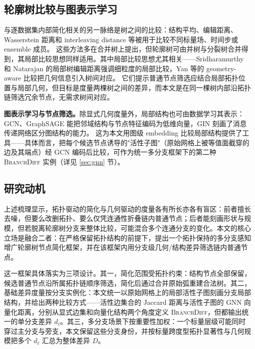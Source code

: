\documentclass[twocolumn, a4paper, 10pt]{article}
\begin{document}
\subsection{轮廓树比较与图表示学习}

与逐数据集内部简化相关的另一脉络是树之间的比较：结构平均、编辑距离、Wasserstein 距离和 interleaving distance 等被用于比较不同标量场、时间步或 ensemble 成员。\cite{yan_average_2020,pont_wasserstein_2022,wetzels_branch_2022} 这些方法多在合并树上提出，但轮廓树可由并树与分裂树合并得到，其局部比较思想同样适用。其中局部比较思想尤其相关——Sridharamurthy 和 Natarajan 的局部树编辑距离强调细粒度的局部比较，Yan 等的 geometry-aware 比较把几何信息引入树间对应。\cite{sridharamurthy_local_2023,yan_geometry_2023} 它们提示普通节点筛选应结合局部拓扑位置与局部几何，但目标是度量两棵树之间的差异，而本文是在同一棵树内部沿拓扑链筛选冗余节点，无需求树间对应。

\textbf{图表示学习与节点筛选。}除显式几何度量外，局部结构也可由数据学习其表示：GCN、GraphSAGE 能把邻域结构与节点特征编码为低维向量，GIN 刻画了消息传递网络区分图结构的能力。\cite{kipf_gcn_2017,hamilton_graphsage_2017,xu_gin_2019} 这为本文用图级 embedding 比较局部结构提供了工具——具体而言，把每个候选节点诱导的"活性子图"（原始网格上被等值面截穿的边及其端点）经 GCN 编码后比较，可作为统一多分支框架下的第二种 \textsc{BranchDiff} 实例（详见 \ref{sec:gnn} 节）。

\subsection{研究动机}

上述梳理显示，拓扑驱动的简化与几何驱动的度量各有所长亦各有盲区：前者擅长去噪，但要么改删拓扑、要么仅凭连通性折叠链内普通节点；后者能刻画形状与规模，但若脱离轮廓树分支来整体比较，可能混合多个连通分支的变化。本文的核心立场是融合二者：在严格保留拓扑结构的前提下，提出一个拓扑保持的多分支感知增广轮廓树节点简化框架，并在该框架内用分支级几何/结构差异筛选链内普通节点。

这一框架具体落实为三项设计。其一，简化范围受拓扑约束：结构节点全部保留，候选普通节点沿所属拓扑链顺序筛选，简化后通过合并原始弧重建合法树。其二，基础差异度量按分支实例化：本文统一以原始网格上的局部活性子图刻画分支局部结构，并给出两种比较方式——活性边集合的 Jaccard 距离与活性子图的 GNN 向量化距离，分别从显式边集和向量化结构两个角度定义 \textsc{BranchDiff}，但都输出统一的单分支差异 $d_\ell$。其三，多分支场景下按重要性加权：一个标量层级可能同时穿过主分支与旁支，本文保留这些分支身份，并按标量跨度型拓扑显著性与几何规模把多个 $d_\ell$ 汇总为整体差异 $D$。
\end{document}
